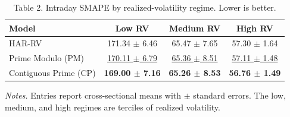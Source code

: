 \begin{table}[H]
\centering
\footnotesize
\caption*{Table 2. Intraday SMAPE by realized-volatility regime. Lower is better.}
\begin{tabular}{lccc}
\toprule
Model & Low RV & Medium RV & High RV \\
\midrule
HAR-RV & 171.34 $\pm$ 6.46 & 65.47 $\pm$ 7.65 & 57.30 $\pm$ 1.64 \\
Prime Modulo (PM) & \underline{170.11 $\pm$ 6.79} & \underline{65.36 $\pm$ 8.51} & \underline{57.11 $\pm$ 1.48} \\
Contiguous Prime (CP) & \textbf{169.00 $\pm$ 7.16} & \textbf{65.26 $\pm$ 8.53} & \textbf{56.76 $\pm$ 1.49} \\
\bottomrule
\end{tabular}
\vspace{2pt}
\footnotesize{\emph{Notes.} Entries report cross-sectional means with $\pm$ standard errors. The low, medium, and high regimes are terciles of realized volatility.}
\end{table}
